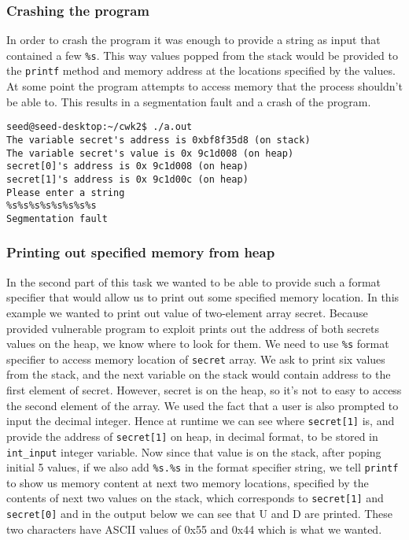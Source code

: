 \documentclass[12pt, a4paper, pdflatex]{article}
\begin{document}
\subsubsection{Crashing the program}
In order to crash the program it was enough to provide a string as input that contained a few \texttt{\%s}. This way values popped from the stack would be provided to the \texttt{printf} method and memory address at the locations specified by the values. At some point the program attempts to access memory that the process shouldn't be able to. This results in a segmentation fault and a crash of the program.

\vspace{1em}
\lstset{
	captionpos=b,
	frame=single,
	language=bash,
  breaklines=true,
	caption=Example of crashing the program,
	label=printf:crash
}
\begin{lstlisting}
seed@seed-desktop:~/cwk2$ ./a.out 
The variable secret's address is 0xbf8f35d8 (on stack)
The variable secret's value is 0x 9c1d008 (on heap)
secret[0]'s address is 0x 9c1d008 (on heap)
secret[1]'s address is 0x 9c1d00c (on heap)
Please enter a string
%s%s%s%s%s%s%s%s
Segmentation fault
\end{lstlisting}

\subsubsection{Printing out specified memory from heap}
In the second part of this task we wanted to be able to provide such a format specifier that would allow us to print out some specified memory location. In this example we wanted to print out value of two-element array secret. Because provided vulnerable program to exploit prints out the address of both secrets values on the heap, we know where to look for them. We need to use \texttt{\%s} format specifier to access memory location of 
\texttt{secret} array. We ask to print six values from the stack, and the next variable on the stack would contain address to the first element of secret. However, secret is on the heap, so it's not to easy to access the second element of the array. We used the fact that a user is also prompted to input the decimal integer. Hence at runtime we can see where \texttt{secret[1]} is, and provide the address of \texttt{secret[1]} on heap, in decimal format, to be stored in \texttt{int\_input} integer variable. Now since that value is on the stack, after poping initial 5 values, if we also add \texttt{\%s.\%s} in the format specifier string, we tell \texttt{printf} to show us memory content at next two memory locations, specified by the contents of next two values on the stack, which corresponds to \texttt{secret[1]} and \texttt{secret[0]} and in the output below we can see that U and D are printed. These two characters have ASCII values of 0x55 and 0x44 which is what we wanted.
\end{document}

